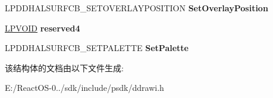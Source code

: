 \begin{DoxyCompactItemize}
\mbox{\label{struct___d_d_h_a_l___d_d_s_u_r_f_a_c_e_c_a_l_l_b_a_c_k_s_a3b2a361a59493e59f86ad748977f3a5a}} 
L\+P\+D\+D\+H\+A\+L\+S\+U\+R\+F\+C\+B\+\_\+\+S\+E\+T\+O\+V\+E\+R\+L\+A\+Y\+P\+O\+S\+I\+T\+I\+ON {\bfseries Set\+Overlay\+Position}
\item 
\mbox{\label{struct___d_d_h_a_l___d_d_s_u_r_f_a_c_e_c_a_l_l_b_a_c_k_s_a5263821e20f77d13eff01a79865199bf}} 
\hyperlink{interfacevoid}{L\+P\+V\+O\+ID} {\bfseries reserved4}
\item 
\mbox{\label{struct___d_d_h_a_l___d_d_s_u_r_f_a_c_e_c_a_l_l_b_a_c_k_s_a8ad197dbe165c9adfcead2c37d09645d}} 
L\+P\+D\+D\+H\+A\+L\+S\+U\+R\+F\+C\+B\+\_\+\+S\+E\+T\+P\+A\+L\+E\+T\+TE {\bfseries Set\+Palette}
\end{DoxyCompactItemize}


该结构体的文档由以下文件生成\+:\begin{DoxyCompactItemize}
\item 
E\+:/\+React\+O\+S-\/0../sdk/include/psdk/ddrawi.\+h\end{DoxyCompactItemize}
